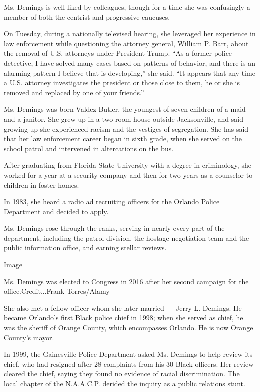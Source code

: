 Ms. Demings is well liked by colleagues, though for a time she was
confusingly a member of both the centrist and progressive caucuses.

On Tuesday, during a nationally televised hearing, she leveraged her
experience in law enforcement while
\href{https://www.nytimes3xbfgragh.onion/2020/07/28/us/politics/barr-testimony.html}{questioning
the attorney general, William P. Barr}, about the removal of U.S.
attorneys under President Trump. ``As a former police detective, I have
solved many cases based on patterns of behavior, and there is an
alarming pattern I believe that is developing,'' she said. ``It appears
that any time a U.S. attorney investigates the president or those close
to them, he or she is removed and replaced by one of your friends.''

Ms. Demings was born Valdez Butler, the youngest of seven children of a
maid and a janitor. She grew up in a two-room house outside
Jacksonville, and said growing up she experienced racism and the
vestiges of segregation. She has said that her law enforcement career
began in sixth grade, when she served on the school patrol and
intervened in altercations on the bus.

After graduating from Florida State University with a degree in
criminology, she worked for a year at a security company and then for
two years as a counselor to children in foster homes.

In 1983, she heard a radio ad recruiting officers for the Orlando Police
Department and decided to apply.

Ms. Demings rose through the ranks, serving in nearly every part of the
department, including the patrol division, the hostage negotiation team
and the public information office, and earning stellar reviews.

Image

Ms. Demings was elected to Congress in 2016 after her second campaign
for the office.Credit...Frank Torres/Alamy

She also met a fellow officer whom she later married --- Jerry L.
Demings. He became Orlando's first Black police chief in 1998; when she
served as chief, he was the sheriff of Orange County, which encompasses
Orlando. He is now Orange County's mayor.

In 1999, the Gainesville Police Department asked Ms. Demings to help
review its chief, who had resigned after 28 complaints from his 30 Black
officers. Her review cleared the chief, saying they found no evidence of
racial discrimination. The local chapter of
\href{https://ufdc.ufl.edu/UF00028290/06832/1x}{the N.A.A.C.P. derided
the inquiry} as a public relations stunt.

